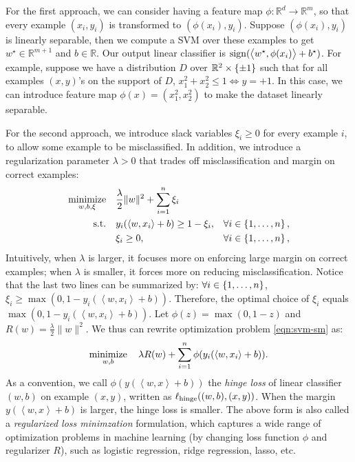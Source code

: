 \documentclass{article}
\DeclareMathOperator*{\hinge}{{\rm hinge}}
\DeclareMathOperator*{\sign}{{\rm sign}}
\DeclareMathOperator*{\minimize}{{\rm minimize}}
\DeclareMathOperator*{\st}{{\rm s.t.}}
\newcommand{\RR}{\mathbb{R}} %
\newcommand{\inner}[2]{\left\langle #1,#2 \right\rangle}
\begin{document}
For the first approach, we can consider having a feature map $\phi: \RR^d \to \RR^m$, so that every example $(x_i, y_i)$ is transformed to $(\phi(x_i), y_i)$. Suppose $(\phi(x_i), y_i)$ is linearly separable, then we compute a SVM over these examples to get $w^\star \in \RR^{m+1}$ and $b \in \RR$. Our output linear classifier is $\sign(\inner{w^\star}{\phi(x_i)} + b^\star)$.
For example, suppose we have a distribution $D$ over $\RR^2 \times \cbr{\pm 1}$ such that for all examples $(x, y)$'s on the support of $D$, $x_1^2 + x_2^2 \leq 1 \Leftrightarrow y = +1$. In this case, we can introduce feature map $\phi(x) = (x_1^2, x_2^2)$ to make the dataset linearly separable.

For the second approach, we introduce slack variables $\xi_i \geq 0$ for every example $i$, to allow some example to be misclassified. In addition, we introduce a regularization parameter
$\lambda > 0$ that trades off misclassification and margin on correct examples:
\begin{align}
  \minimize_{w,b,\xi} \quad & \frac \lambda 2 \| w \|^2 + \sum_{i=1}^n \xi_i & \label{eqn:svm-sm} \\
    \st \quad &  y_i(\inner{w}{x_i} + b) \geq 1 - \xi_i, &\forall i \in \cbr{1,\ldots,n}, \nonumber \\
    &  \xi_i \geq 0, &\forall i \in \cbr{1,\ldots,n}, \nonumber
\end{align}
Intuitively, when $\lambda$ is larger, it focuses more on enforcing large margin on correct examples; when $\lambda$ is smaller, it forces more on reducing misclassification.
Notice that the last two lines can be summarized by: $\forall i \in \cbr{1,\ldots,n}$, $\xi_i \geq \max(0, 1-y_i(\inner{w}{x_i} + b))$. Therefore, the optimal choice of $\xi_i$ equals $\max(0, 1-y_i(\inner{w}{x_i} + b))$.
Let $\phi(z) = \max(0,1-z)$ and $R(w) = \frac{\lambda}{2}\| w \|^2$. We thus can rewrite optimization problem \eqref{eqn:svm-sm} as:
\begin{equation}
    \minimize_{w,b} \quad \lambda R(w)  + \sum_{i=1}^n \phi(y_i(\inner{w}{x_i} + b)).
\end{equation}
As a convention, we call $\phi(y(\inner{w}{x} + b))$ the {\em hinge loss} of linear classifier $(w,b)$ on example $(x,y)$, written as $\ell_{\hinge}((w,b), (x,y))$. When the margin $y(\inner{w}{x} + b)$ is larger, the hinge loss is smaller. The above form is also called a {\em regularized loss minimzation} formulation, which captures a wide range of optimization problems in machine learning (by changing loss function $\phi$ and regularizer $R$), such as logistic regression, ridge regression, lasso, etc.
\end{document}
